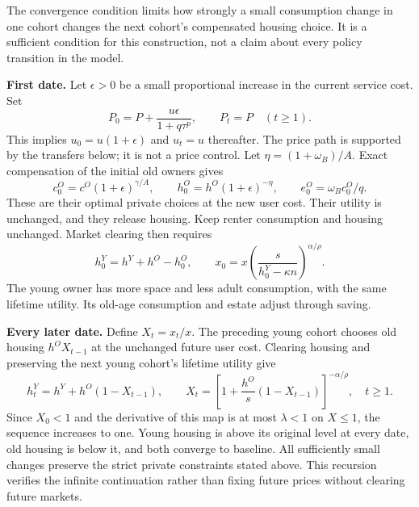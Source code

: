 \documentclass[11pt]{article}
\begin{document}
The convergence condition limits how strongly a small consumption change in
one cohort changes the next cohort's compensated housing choice. It is a
sufficient condition for this construction, not a claim about every policy
transition in the model.

\textbf{First date.} Let $\epsilon>0$ be a small proportional increase in the
current service cost. Set
\begin{equation}
 P_0=P+\frac{u\epsilon}{1+q\tau^p},\qquad
 P_t=P\quad(t\geq1).
\end{equation}
This implies $u_0=u(1+\epsilon)$ and $u_t=u$ thereafter. The price path is
supported by the transfers below; it is not a price control.
Let $\eta=(1+\omega_B)/A$. Exact compensation of the initial old owners gives
\begin{equation}
 c_0^O=c^O(1+\epsilon)^{\gamma/A},\qquad
 h_0^O=h^O(1+\epsilon)^{-\eta},\qquad e_0^O=\omega_B c_0^O/q.
 \label{eq:initialold}
\end{equation}
These are their optimal private choices at the new user cost. Their utility
is unchanged, and they release housing. Keep renter consumption and housing
unchanged. Market clearing then requires
\begin{equation}
 h_0^Y=h^Y+h^O-h_0^O,\qquad
 x_0=x\left(\frac{s}{h_0^Y-\kappa n}\right)^{\alpha/\rho}.
 \label{eq:firstyoung}
\end{equation}
The young owner has more space and less adult consumption, with the same
lifetime utility. Its old-age consumption and estate adjust through saving.

\textbf{Every later date.} Define $X_t=x_t/x$. The preceding young cohort
chooses old housing $h^OX_{t-1}$ at the unchanged future user cost. Clearing
housing and preserving the next young cohort's lifetime utility give
\begin{equation}
 h_t^Y=h^Y+h^O(1-X_{t-1}),\qquad
 X_t=\left[1+\frac{h^O}{s}(1-X_{t-1})\right]^{-\alpha/\rho},
 \quad t\geq1.
 \label{eq:recursion}
\end{equation}
Since $X_0<1$ and the derivative of this map is at most $\lambda<1$ on
$X\leq1$, the sequence increases to one. Young housing is above its original
level at every date, old housing is below it, and both converge to baseline.
All sufficiently small changes preserve the strict private constraints stated
above. This recursion verifies the infinite continuation rather than fixing
future prices without clearing future markets.
\end{document}
